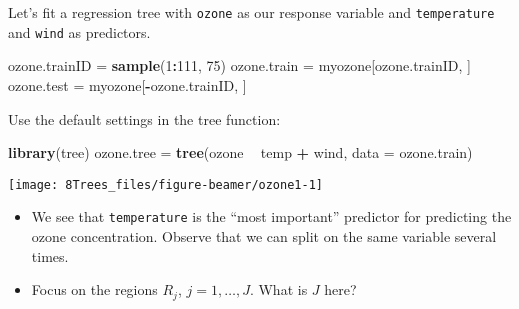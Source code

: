 \documentclass[10pt,ignorenonframetext,]{beamer}
\newenvironment{Shaded}{\begin{snugshade}}{\end{snugshade}}
\newcommand{\DataTypeTok}[1]{\textcolor[rgb]{0.13,0.29,0.53}{#1}}
\newcommand{\DecValTok}[1]{\textcolor[rgb]{0.00,0.00,0.81}{#1}}
\newcommand{\KeywordTok}[1]{\textcolor[rgb]{0.13,0.29,0.53}{\textbf{#1}}}
\newcommand{\NormalTok}[1]{#1}
\newcommand{\OperatorTok}[1]{\textcolor[rgb]{0.81,0.36,0.00}{\textbf{#1}}}
\newcommand{\StringTok}[1]{\textcolor[rgb]{0.31,0.60,0.02}{#1}}
\begin{document}
\begin{frame}[fragile]

Let's fit a regression tree with \texttt{ozone} as our response variable
and \texttt{temperature} and \texttt{wind} as predictors.

\scriptsize

\begin{Shaded}
\begin{Highlighting}[]
\NormalTok{ozone.trainID =}\StringTok{ }\KeywordTok{sample}\NormalTok{(}\DecValTok{1}\OperatorTok{:}\DecValTok{111}\NormalTok{, }\DecValTok{75}\NormalTok{)}
\NormalTok{ozone.train =}\StringTok{ }\NormalTok{myozone[ozone.trainID, ]}
\NormalTok{ozone.test =}\StringTok{ }\NormalTok{myozone[}\OperatorTok{-}\NormalTok{ozone.trainID, ]}
\end{Highlighting}
\end{Shaded}

\normalsize

Use the default settings in the tree function:

\scriptsize

\begin{Shaded}
\begin{Highlighting}[]
\KeywordTok{library}\NormalTok{(tree)}
\NormalTok{ozone.tree =}\StringTok{ }\KeywordTok{tree}\NormalTok{(ozone }\OperatorTok{~}\StringTok{ }\NormalTok{temp }\OperatorTok{+}\StringTok{ }\NormalTok{wind, }\DataTypeTok{data =}\NormalTok{ ozone.train)}
\end{Highlighting}
\end{Shaded}

\begin{center}\texttt{[image: 8Trees\_files/figure-beamer/ozone1-1]} \end{center}

\end{frame}

\begin{frame}[fragile]

\begin{itemize}
\item
  We see that \texttt{temperature} is the ``most important'' predictor
  for predicting the ozone concentration. Observe that we can split on
  the same variable several times.
\item
  Focus on the regions \(R_j\), \(j=1,\ldots, J\). What is \(J\) here?
\end{itemize}

\end{frame}
\end{document}
